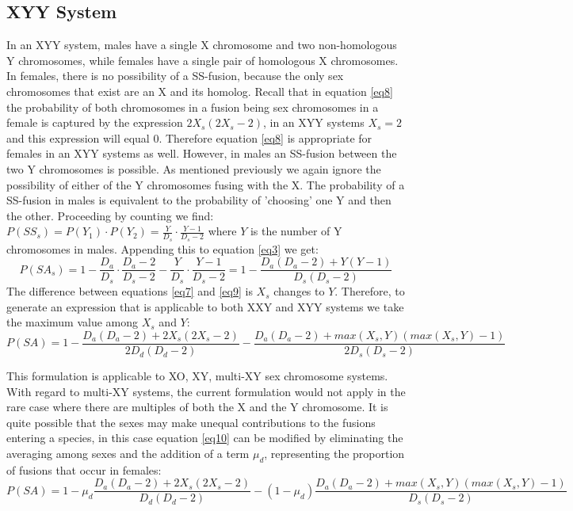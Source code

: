 \documentclass[12pt]{article}
\begin{document}
\subsection{XYY System}
In an XYY system, males have a single X chromosome and two non-homologous Y chromosomes, while females have a single pair of homologous X chromosomes.
In females, there is no possibility of a SS-fusion, because the only sex chromosomes that exist are an X and its homolog. 
Recall that in equation \ref{eq8} the probability of both chromosomes in a fusion being sex chromosomes in a female is captured by the expression $2X_s(2X_s-2)$, in an XYY systems $X_s=2$ and this expression will equal 0. 
Therefore equation \ref{eq8} is appropriate for females in an XYY systems as well.
However, in males an SS-fusion between the two Y chromosomes is possible.
As mentioned previously we again ignore the possibility of either of the Y chromosomes fusing with the X.
The probability of a SS-fusion in males is equivalent to the probability of 'choosing' one Y and then the other. 
Proceeding by counting we find: $ P(SS_s) = P(Y_1) \cdot P(Y_2) = \frac{Y}{D_s} \cdot \frac{Y - 1}{D_s - 2}$ where $Y$ is the number of Y chromosomes in males.
Appending this to equation \ref{eq3} we get:
    \begin{equation} \label{eq9}
        P(SA_s) = 1 - \frac{D_a}{D_s} \cdot \frac{D_a - 2}{D_s - 2} - \frac{Y}{D_s} \cdot \frac{Y - 1}{D_s - 2} = 1 - \frac{D_a(D_a - 2) + Y(Y - 1)}{D_s(D_s - 2)}
    \end{equation}
The difference between equations \ref{eq7} and \ref{eq9} is $X_s$ changes to $Y$. 
Therefore, to generate an expression that is applicable to both XXY and XYY systems we take the maximum value among $X_s$ and $Y$:
    \begin{equation} \label{eq10}
        P(SA) = 1 -\frac{D_a(D_a-2) + 2X_s(2X_s-2)}{2D_d(D_d-2)} - \frac{D_a(D_a - 2) + max(X_s,Y)(max(X_s,Y)-1)}{2D_s(D_s-2)}
    \end{equation}

This formulation is applicable to XO, XY, multi-XY sex chromosome systems.
With regard to multi-XY systems, the current formulation would not apply in the rare case where there are multiples of both the X and the Y chromosome.
It is quite possible that the sexes may make unequal contributions to the fusions entering a species, in this case equation \ref{eq10} can be modified by eliminating the averaging among sexes and the addition of a term $\mu_d$, representing the proportion of fusions that occur in females: 
    \begin{equation} \label{eq11}
        P(SA) = 1 -\mu_d\frac{D_a(D_a-2) + 2X_s(2X_s-2)}{D_d(D_d-2)} - (1-\mu_d)\frac{D_a(D_a - 2) + max(X_s,Y)(max(X_s,Y)-1)}{D_s(D_s-2)}
    \end{equation}
\end{document}
